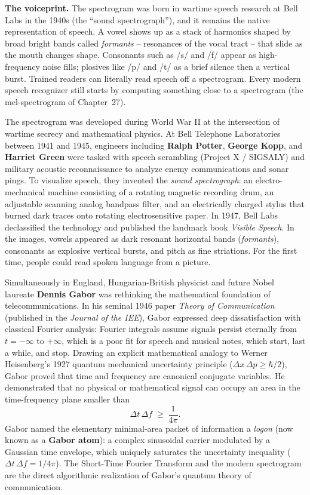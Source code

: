 \begin{applicationbox}
\textbf{The voiceprint.} The spectrogram was born in wartime speech research at
Bell Labs in the 1940s (the ``sound spectrograph''), and it remains the native
representation of speech. A vowel shows up as a stack of harmonics shaped by
broad bright bands called \emph{formants} -- resonances of the vocal tract -- that
slide as the mouth changes shape. Consonants such as /s/ and /f/ appear as
high-frequency noise fills; plosives like /p/ and /t/ as a brief silence then a
vertical burst. Trained readers can literally read speech off a spectrogram. Every
modern speech recognizer still starts by computing something close to a
spectrogram (the mel-spectrogram of Chapter~27).
\end{applicationbox}

\begin{historybox}
The spectrogram was developed during World War II at the intersection of wartime secrecy and
mathematical physics. At Bell Telephone Laboratories between 1941 and 1945, engineers including
\textbf{Ralph Potter}, \textbf{George Kopp}, and \textbf{Harriet Green} were tasked with speech
scrambling (Project X / SIGSALY) and military acoustic reconnaissance to analyze enemy communications
and sonar pings. To visualize speech, they invented the \emph{sound spectrograph}: an electro-mechanical
machine consisting of a rotating magnetic recording drum, an adjustable scanning analog bandpass filter,
and an electrically charged stylus that burned dark traces onto rotating electrosensitive paper.
In 1947, Bell Labs declassified the technology and published the landmark book \emph{Visible Speech}.
In the images, vowels appeared as dark resonant horizontal bands (\emph{formants}),
consonants as explosive vertical bursts, and pitch as fine striations. For the first time,
people could read spoken language from a picture.

Simultaneously in England, Hungarian-British physicist and future Nobel laureate \textbf{Dennis Gabor}
was rethinking the mathematical foundation of telecommunications. In his seminal 1946 paper
\emph{Theory of Communication} (published in the \emph{Journal of the IEE}), Gabor expressed deep
dissatisfaction with classical Fourier analysis: Fourier integrals assume signals persist eternally
from $t = -\infty$ to $+\infty$, which is a poor fit for speech and musical notes, which start, last a
while, and stop. Drawing an explicit mathematical analogy to Werner Heisenberg's 1927
quantum mechanical uncertainty principle ($\Delta x\,\Delta p \ge \hbar/2$), Gabor proved that
time and frequency are canonical conjugate variables. He demonstrated that no physical or
mathematical signal can occupy an area in the time-frequency plane smaller than
\[
\Delta t\,\Delta f \;\ge\; \frac{1}{4\pi}.
\]
Gabor named the elementary minimal-area packet of information a \emph{logon} (now known as a
\textbf{Gabor atom}): a complex sinusoidal carrier modulated by a Gaussian time envelope, which
uniquely saturates the uncertainty inequality ($\Delta t\,\Delta f = 1/4\pi$). The Short-Time
Fourier Transform and the modern spectrogram are the direct algorithmic realization of Gabor's
quantum theory of communication.
\end{historybox}

